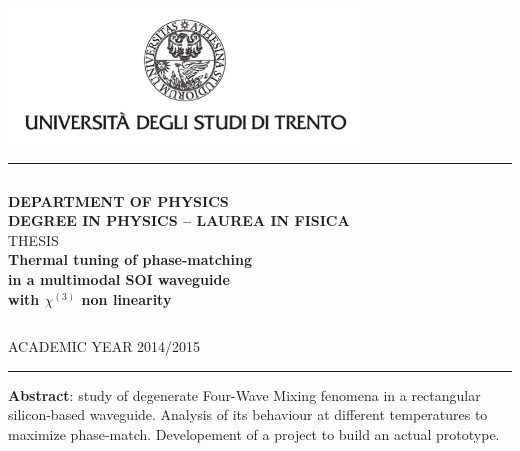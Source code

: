 \documentclass[11pt,a4paper]{article}
\begin{document}
\begin{titlepage}
\begin{center}

\includegraphics[width=0.7\textwidth]{unitn_logo.png}~\\[1.2cm]

\hrule
$$$$
$$$$

\textsc{\LARGE \textbf{DEPARTMENT OF PHYSICS}}\\[0.5cm]
\textsc{\LARGE \textbf{DEGREE IN PHYSICS – LAUREA IN FISICA}}\\[2.5cm]
\textsc{\Large THESIS}\\[1.3cm]

{ \huge \bfseries Thermal tuning of phase-matching}\\
[0.5cm]
{ \huge \bfseries in a multimodal SOI waveguide}\\
[0.5cm]
{ \huge \bfseries with $\chi^{(3)}$ non linearity}\\
[3.0cm]

\begin{parcolumns}{2}
\end{parcolumns}
$$$$
$$$$
$$$$
$$$$
$$$$
$$$$
$$$$
$$$$

\large ACADEMIC YEAR 2014/2015
\hrule
\vfill
\textbf{Abstract}: study of degenerate Four-Wave Mixing fenomena in a rectangular silicon-based waveguide.
Analysis of its behaviour at different temperatures to maximize phase-match.
Developement of a project to build an actual prototype.

\vfill

{\large}

\end{center}
\end{titlepage}
\end{document}
